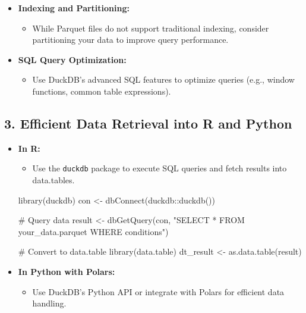\documentclass[
  american,
  10,
  a4paper,
]{book}
\newenvironment{Shaded}{\begin{snugshade}}{\end{snugshade}}
\newcommand{\CommentTok}[1]{\textcolor[rgb]{0.37,0.37,0.37}{#1}}
\newcommand{\FunctionTok}[1]{\textcolor[rgb]{0.28,0.35,0.67}{#1}}
\newcommand{\NormalTok}[1]{\textcolor[rgb]{0.00,0.23,0.31}{#1}}
\newcommand{\OtherTok}[1]{\textcolor[rgb]{0.00,0.23,0.31}{#1}}
\newcommand{\SpecialCharTok}[1]{\textcolor[rgb]{0.37,0.37,0.37}{#1}}
\newcommand{\StringTok}[1]{\textcolor[rgb]{0.13,0.47,0.30}{#1}}
\providecommand{\tightlist}{%
  \setlength{\itemsep}{0pt}\setlength{\parskip}{0pt}}
\theoremstyle{definition}
\theoremstyle{remark}
\begin{document}
\begin{itemize}
\item
  \textbf{Indexing and Partitioning:}

  \begin{itemize}
  \tightlist
  \item
    While Parquet files do not support traditional indexing, consider
    partitioning your data to improve query performance.
  \end{itemize}
\item
  \textbf{SQL Query Optimization:}

  \begin{itemize}
  \tightlist
  \item
    Use DuckDB's advanced SQL features to optimize queries (e.g., window
    functions, common table expressions).
  \end{itemize}
\end{itemize}

\subsection{\texorpdfstring{\textbf{3. Efficient Data Retrieval into R
and
Python}}{3. Efficient Data Retrieval into R and Python}}\label{efficient-data-retrieval-into-r-and-python}

\begin{itemize}
\item
  \textbf{In R:}

  \begin{itemize}
  \tightlist
  \item
    Use the \texttt{duckdb} package to execute SQL queries and fetch
    results into data.tables.
  \end{itemize}

\begin{Shaded}
\begin{Highlighting}[]
\FunctionTok{library}\NormalTok{(duckdb)}
\NormalTok{con }\OtherTok{\textless{}{-}} \FunctionTok{dbConnect}\NormalTok{(duckdb}\SpecialCharTok{::}\FunctionTok{duckdb}\NormalTok{())}

\CommentTok{\# Query data}
\NormalTok{result }\OtherTok{\textless{}{-}} \FunctionTok{dbGetQuery}\NormalTok{(con, }\StringTok{"SELECT * FROM \textquotesingle{}your\_data.parquet\textquotesingle{} WHERE conditions"}\NormalTok{)}

\CommentTok{\# Convert to data.table}
\FunctionTok{library}\NormalTok{(data.table)}
\NormalTok{dt\_result }\OtherTok{\textless{}{-}} \FunctionTok{as.data.table}\NormalTok{(result)}
\end{Highlighting}
\end{Shaded}
\item
  \textbf{In Python with Polars:}

  \begin{itemize}
  \tightlist
  \item
    Use DuckDB's Python API or integrate with Polars for efficient data
    handling.
  \end{itemize}
\end{itemize}
\end{document}
